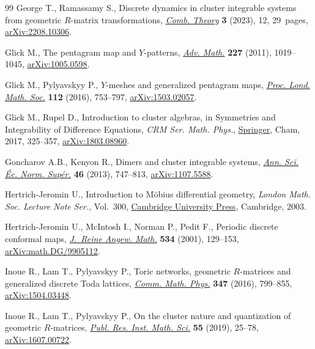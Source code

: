 \documentclass[10pt,a4paper]{amsart}
\numberwithin{equation}{section}
\begin{document}
\begin{thebibliography}{99}
George T., Ramassamy S., Discrete dynamics in cluster integrable systems from
 geometric {$R$}-matrix transformations,
 \href{https://doi.org/10.5070/c63261990}{\textit{Comb. Theory}} \textbf{3}
 (2023), 12, 29~pages,
 \href{http://arxiv.org/abs/2208.10306}{arXiv:2208.10306}.

Glick M., The pentagram map and {$Y$}-patterns,
 \href{https://doi.org/10.1016/j.aim.2011.02.018}{\textit{Adv. Math.}}
 \textbf{227} (2011), 1019--1045,
 \href{http://arxiv.org/abs/1005.0598}{arXiv:1005.0598}.

Glick M., Pylyavskyy P., {$Y$}-meshes and generalized pentagram maps,
 \href{https://doi.org/10.1112/plms/pdw007}{\textit{Proc. Lond. Math. Soc.}}
 \textbf{112} (2016), 753--797,
 \href{http://arxiv.org/abs/1503.02057}{arXiv:1503.02057}.

Glick M., Rupel D., Introduction to cluster algebras, in Symmetries and
 Integrability of Difference Equations, \textit{CRM Ser. Math. Phys.},
 \href{https://doi.org/10.1007/978-3-319-56666-5_7}{Springer}, Cham, 2017,
 325--357, \href{http://arxiv.org/abs/1803.08960}{arXiv:1803.08960}.

Goncharov A.B., Kenyon R., Dimers and cluster integrable systems,
 \href{https://doi.org/10.24033/asens.2201}{\textit{Ann. Sci. \'Ec. Norm.
 Sup\'er.}} \textbf{46} (2013), 747--813,
 \href{http://arxiv.org/abs/1107.5588}{arXiv:1107.5588}.

Hertrich-Jeromin U., Introduction to {M}\"obius differential geometry,
 \textit{London Math. Soc. Lecture Note Ser.}, Vol.~300,
 \href{https://doi.org/10.1017/CBO9780511546693}{Cambridge University Press},
 Cambridge, 2003.

Hertrich-Jeromin U., McIntosh I., Norman P., Pedit F., Periodic discrete
 conformal maps, \href{https://doi.org/10.1515/crll.2001.038}{\textit{J.~Reine
 Angew. Math.}} \textbf{534} (2001), 129--153,
 \href{http://arxiv.org/abs/math.DG/9905112}{arXiv:math.DG/9905112}.

Inoue R., Lam T., Pylyavskyy P., Toric networks, geometric {$R$}-matrices and
 generalized discrete {T}oda lattices,
 \href{https://doi.org/10.1007/s00220-016-2739-z}{\textit{Comm. Math. Phys.}}
 \textbf{347} (2016), 799--855,
 \href{http://arxiv.org/abs/1504.03448}{arXiv:1504.03448}.

Inoue R., Lam T., Pylyavskyy P., On the cluster nature and quantization of
 geometric {$R$}-matrices,
 \href{https://doi.org/10.4171/PRIMS/55-1-2}{\textit{Publ. Res. Inst. Math.
 Sci.}} \textbf{55} (2019), 25--78,
 \href{http://arxiv.org/abs/1607.00722}{arXiv:1607.00722}.


\end{thebibliography}
\end{document}
